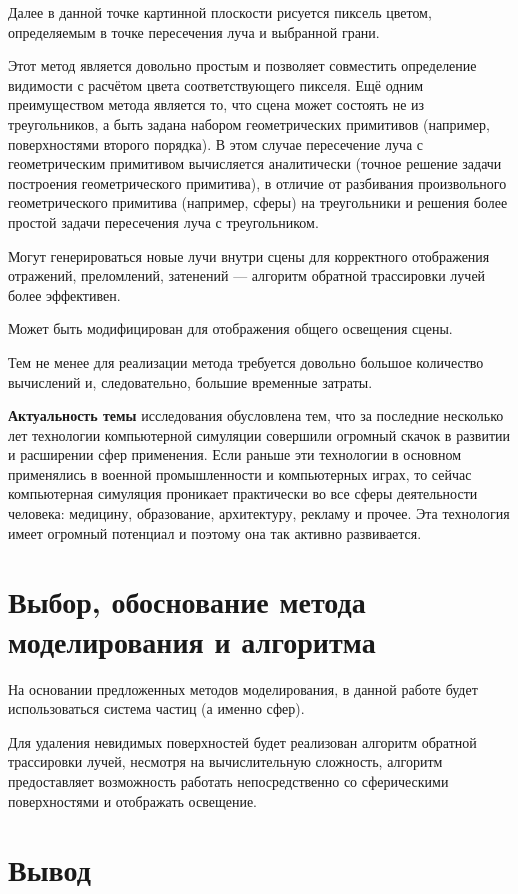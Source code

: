  Далее в данной точке картинной плоскости рисуется пиксель цветом, определяемым в точке пересечения луча и выбранной грани. 
 
 Этот метод является довольно простым и позволяет совместить определение видимости с расчётом цвета соответствующего пикселя. Ещё одним преимуществом метода является то, что сцена может состоять не из треугольников, а быть задана набором геометрических примитивов (например, поверхностями второго порядка). В этом случае пересечение луча с геометрическим примитивом вычисляется аналитически (точное решение задачи построения геометрического примитива), в отличие от разбивания произвольного геометрического примитива (например, сферы) на треугольники и решения более простой задачи пересечения луча с треугольником. 
 
 Могут генерироваться новые лучи внутри сцены для корректного отображения отражений, преломлений, затенений --- алгоритм обратной трассировки лучей более эффективен.
 
Может быть модифицирован для отображения общего освещения сцены. 

Тем не менее для реализации метода требуется довольно большое количество вычислений и, следовательно, большие временные затраты. 


\textbf{Актуальность темы} исследования обусловлена тем, что за последние несколько лет технологии компьютерной симуляции совершили огромный скачок в развитии и расширении сфер применения. Если раньше эти технологии в основном применялись в военной промышленности и компьютерных играх, то сейчас компьютерная симуляция проникает практически во все сферы деятельности человека: медицину, образование, архитектуру, рекламу и прочее. Эта технология имеет огромный потенциал и поэтому она так активно развивается.

\section{\textbf{Выбор, обоснование метода моделирования и алгоритма}}

На основании предложенных методов моделирования, в данной работе будет использоваться система частиц (а именно сфер). 

Для удаления невидимых поверхностей будет реализован алгоритм обратной трассировки лучей, несмотря на вычислительную сложность, алгоритм предоставляет возможность работать непосредственно со сферическими поверхностями и отображать освещение. 

\section{\textbf{Вывод}}

